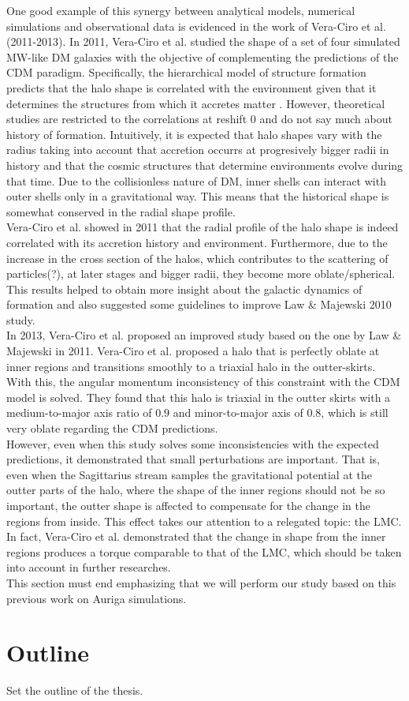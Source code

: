 One good example of this synergy between analytical models, numerical simulations and observational data is evidenced in the work of Vera-Ciro et al. (2011-2013). In 2011, Vera-Ciro et al. studied the shape of a set of four simulated MW-like DM galaxies with the objective of complementing the predictions of the CDM paradigm. Specifically, the hierarchical model of structure formation predicts that the halo shape is correlated with the environment given that it determines the structures from which it accretes matter \cite{referencias sobre relacion entre forma y entorno}. However, theoretical studies are restricted to the correlations at reshift 0 and do not say much about history of formation. Intuitively, it is expected that halo shapes vary with the radius taking into account that accretion occurrs at progresively bigger radii in history and that the cosmic structures that determine environments evolve during that time. Due to the collisionless nature of DM, inner shells can interact with outer shells only in a gravitational way. This means that the historical shape is somewhat conserved in the radial shape profile.\\

Vera-Ciro et al.  showed in 2011 that the radial profile of the halo shape is indeed correlated with its accretion history and environment. Furthermore, due to the increase in the cross section of the halos, which contributes to the scattering of particles(?), at later stages and bigger radii, they become more oblate/spherical. This results helped to obtain more insight about the galactic dynamics of formation and also suggested some guidelines to improve Law \& Majewski 2010 study.\\

In 2013, Vera-Ciro et al. proposed an improved study based on the one by Law \& Majewski in 2011. Vera-Ciro et al. proposed a halo that is perfectly oblate at inner regions and transitions smoothly to a triaxial halo in the outter-skirts. With this, the angular momentum inconsistency of this constraint with the CDM model is solved. They found that this halo is triaxial in the outter skirts with a medium-to-major axis ratio of $0.9$ and minor-to-major axis of $0.8$, which is still very oblate regarding the CDM predictions.\\

However, even when this study solves some inconsistencies with the expected predictions, it demonstrated that small perturbations are important. That is, even when the Sagittarius stream samples the gravitational potential at the outter parts of the halo, where the shape of the inner regions should not be so important, the outter shape is affected to compensate for the change in the regions from inside. This effect takes our attention to a relegated topic: the LMC. In fact, Vera-Ciro et al. demonstrated that the change in shape from the inner regions produces a torque comparable to that of the LMC, which should be taken into account in further researches.\\

%

This section must end emphasizing that we will perform our study based on this previous work on Auriga simulations.

\section{Outline}

Set the outline of the thesis.
